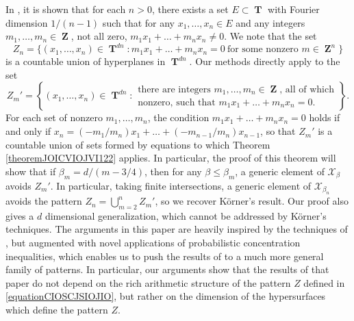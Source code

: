 \documentclass[12pt,reqno]{article}
\numberwithin{equation}{section}
\DeclareMathOperator{\ZZ}{\mathbf{Z}}
\DeclareMathOperator{\TT}{\mathbf{T}}
\numberwithin{theorem}{section}
\begin{document}
In \cite{Korner2}, it is shown that for each $n > 0$, there exists a set $E \subset \TT$ with Fourier dimension $1/(n-1)$ such that for any $x_1,\dots,x_n \in E$ and any integers $m_1,\dots,m_n \in \ZZ$, not all zero, $m_1x_1 + \dots + m_nx_n \neq 0$. We note that the set
%
\begin{equation} \label{equationCIOSCJSIOJIO}
    Z_n = \{ (x_1,\dots,x_n) \in \TT^{dn}: m_1x_1 + \dots + m_nx_n = 0\ \text{for some nonzero $m \in \ZZ^n$} \}
\end{equation}
%
is a countable union of hyperplanes in $\TT^{dn}$. Our methods directly apply to the set
%
\[ Z_m' = \left\{ (x_1,\dots,x_n) \in \TT^{dn}: \begin{array}{c}
            \text{there are integers $m_1,\dots,m_n \in \ZZ$, all of which}\\
            \text{nonzero, such that $m_1x_1 + \dots + m_nx_n = 0$.}
        \end{array} \right\}. \]
%
For each set of nonzero $m_1,\dots,m_n$, the condition $m_1x_1 + \dots + m_nx_n = 0$ holds if and only if $x_n = (-m_1/m_n) x_1 + \dots + (-m_{n-1}/m_n) x_{n-1}$, so that $Z_m'$ is a countable union of sets formed by equations to which Theorem \ref{theoremJOICVIOJVI122} applies. In particular, the proof of this theorem will show that if $\beta_m = d/(m-3/4)$, then for any $\beta \leq \beta_m$, a generic element of $\mathcal{X}_\beta$ avoids $Z_m'$. In particular, taking finite intersections, a generic element of $\mathcal{X}_{\beta_n}$ avoids the pattern $Z_n = \bigcup_{m = 2}^n Z_m'$, so we recover K\"{o}rner's result. Our proof also gives a $d$ dimensional generalization, which cannot be addressed by K\"{o}rner's techniques. The arguments in this paper are heavily inspired by the techniques of \cite{Korner2}, but augmented with novel applications of probabilistic concentration inequalities, which enables us to push the results of \cite{Korner2} to a much more general family of patterns. In particular, our arguments show that the results of that paper do not depend on the rich arithmetic structure of the pattern $Z$ defined in \eqref{equationCIOSCJSIOJIO}, but rather on the dimension of the hypersurfaces which define the pattern $Z$.

\end{document}
